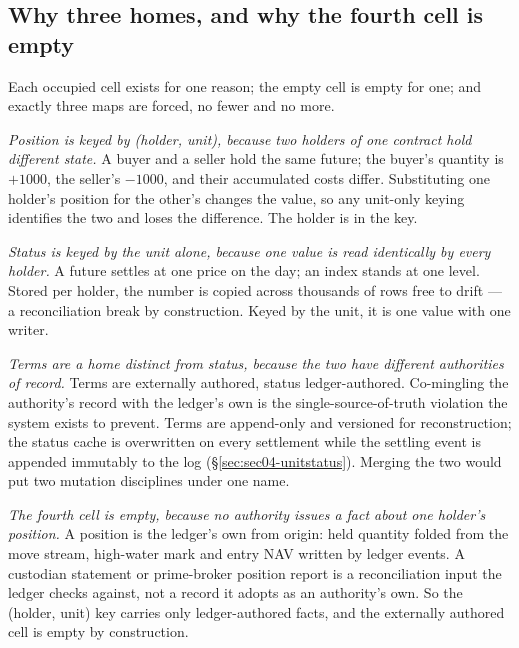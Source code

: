 

\subsection{Why three homes, and why the fourth cell is empty}
\label{sec:sec04-three}

Each occupied cell exists for one reason; the empty cell is empty for one; and exactly
three maps are forced, no fewer and no more.

\emph{Position is keyed by (holder, unit), because two holders of one contract hold
different state.} A buyer and a seller hold the same future; the buyer's quantity is
$+1000$, the seller's $-1000$, and their accumulated costs differ. Substituting one
holder's position for the other's changes the value, so any unit-only keying identifies the
two and loses the difference. The holder is in the key.

\emph{Status is keyed by the unit alone, because one value is read identically by every
holder.} A future settles at one price on the day; an index stands at one level. Stored
per holder, the number is copied across thousands of rows free to drift --- a
reconciliation break by construction. Keyed by the unit, it is one value with one writer.

\emph{Terms are a home distinct from status, because the two have different authorities of
record.} Terms are externally authored, status ledger-authored. Co-mingling the
authority's record with the ledger's own is the single-source-of-truth violation the
system exists to prevent. Terms are append-only and versioned for reconstruction; the
status cache is overwritten on every settlement while the settling event is appended
immutably to the log (\S\ref{sec:sec04-unitstatus}). Merging the two would put two
mutation disciplines under one name.

\emph{The fourth cell is empty, because no authority issues a fact about one holder's
position.} A position is the ledger's own from origin: held quantity folded from the move
stream, high-water mark and entry NAV written by ledger events. A custodian statement or
prime-broker position report is a reconciliation input the ledger checks against, not a
record it adopts as an authority's own. So the (holder, unit) key carries only
ledger-authored facts, and the externally authored cell is empty by construction.

